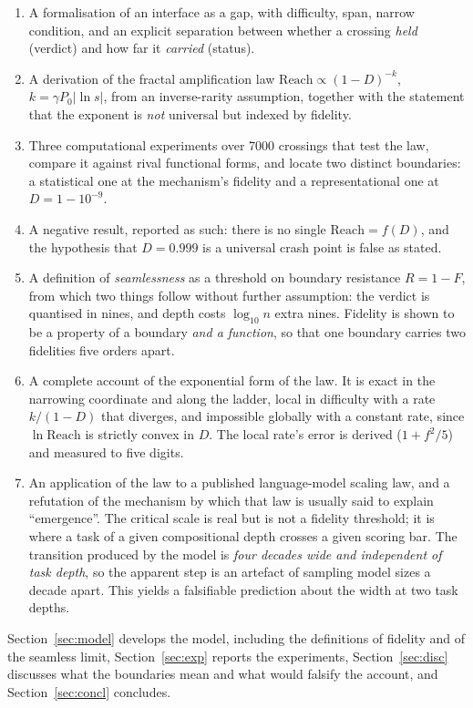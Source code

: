 \documentclass[conference]{IEEEtran}
\theoremstyle{definition}
\begin{document}
\begin{enumerate}
\item A formalisation of an interface as a gap, with difficulty, span, narrow
condition, and an explicit separation between whether a crossing \emph{held}
(verdict) and how far it \emph{carried} (status).
\item A derivation of the fractal amplification law
$\mathrm{Reach}\propto(1-D)^{-k}$, $k=\gamma P_0\lvert\ln s\rvert$, from an
inverse-rarity assumption, together with the statement that the exponent is
\emph{not} universal but indexed by fidelity.
\item Three computational experiments over \num{7000} crossings that test the law,
compare it against rival functional forms, and locate two distinct boundaries: a
statistical one at the mechanism's fidelity and a representational one at
$D=1-10^{-9}$.
\item A negative result, reported as such: there is no single
$\mathrm{Reach}=f(D)$, and the hypothesis that $D=0.999$ is a universal crash
point is false as stated.
\item A definition of \emph{seamlessness} as a threshold on boundary resistance
$R=1-F$, from which two things follow without further assumption: the verdict is
quantised in nines, and depth costs $\log_{10}n$ extra nines. Fidelity is shown to
be a property of a boundary \emph{and a function}, so that one boundary carries
two fidelities five orders apart.
\item A complete account of the exponential form of the law. It is exact in the
narrowing coordinate and along the ladder, local in difficulty with a rate
$k/(1-D)$ that diverges, and impossible globally with a constant rate, since
$\ln\mathrm{Reach}$ is strictly convex in $D$. The local rate's error is derived
($1+f^{2}/5$) and measured to five digits.
\item An application of the law to a published language-model scaling law, and a
refutation of the mechanism by which that law is usually said to explain
``emergence''. The critical scale is real but is not a fidelity threshold; it is
where a task of a given compositional depth crosses a given scoring bar. The
transition produced by the model is \emph{four decades wide and independent of
task depth}, so the apparent step is an artefact of sampling model sizes a decade
apart. This yields a falsifiable prediction about the width at two task depths.
\end{enumerate}

Section~\ref{sec:model} develops the model, including the definitions of fidelity
and of the seamless limit, Section~\ref{sec:exp} reports the experiments,
Section~\ref{sec:disc} discusses what the boundaries mean and what would falsify
the account, and Section~\ref{sec:concl} concludes.
\end{document}
